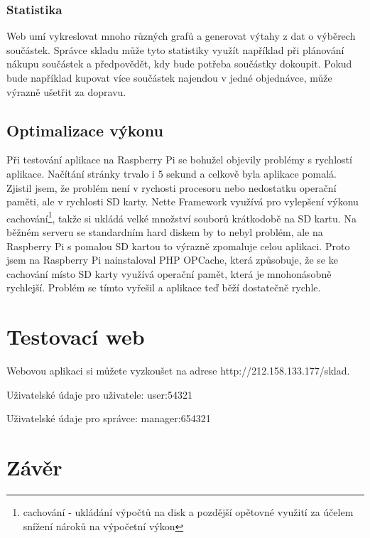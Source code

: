\documentclass[12pt, a4paper, oneside]{article}
\begin{document}
\subsubsection{Statistika}

Web umí vykreslovat mnoho různých grafů a generovat výtahy z dat o výběrech součástek. Správce skladu může tyto statistiky využít například při plánování nákupu součástek a předpovědět, kdy bude potřeba součástky dokoupit. Pokud bude například kupovat více součástek najendou v jedné objednávce, může výrazně ušetřit za dopravu.

\subsection{Optimalizace výkonu}

Při testování aplikace na Raspberry Pi se bohužel objevily problémy s rychlostí aplikace. Načítání stránky trvalo i 5 sekund a celkově byla aplikace pomalá. Zjistil jsem, že problém není v rychosti procesoru nebo nedostatku operační paměti, ale v rychlosti SD karty. Nette Framework využívá pro vylepšení výkonu cachování\footnote{cachování - ukládání výpočtů na disk a pozdější opětovné využití za účelem snížení nároků na výpočetní výkon}, takže si ukládá velké množství souborů krátkodobě na SD kartu. Na běžném serveru se standardním hard diskem by to nebyl problém, ale na Raspberry Pi s pomalou SD kartou to výrazně zpomaluje celou aplikaci. Proto jsem na Raspberry Pi nainstaloval PHP OPCache\cite{opcache}, která způsobuje, že se ke cachování místo SD karty využívá operační pamět, která je mnohonásobně rychlejší. Problém se tímto vyřešil a aplikace teď běží dostatečně rychle.

\newpage

\section{Testovací web}

Webovou aplikaci si můžete vyzkoušet na adrese http://212.158.133.177/sklad.

Uživatelské údaje pro uživatele: user:54321

Uživatelské údaje pro správce: manager:654321

\section*{Závěr} %
\end{document}
